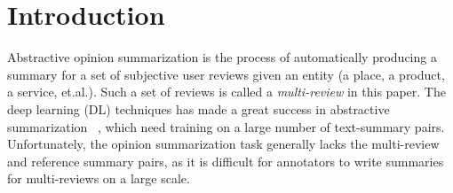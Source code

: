 \section{Introduction}
\label{sec:intro}


Abstractive opinion summarization is the process of 
automatically producing a summary for a set of 
subjective user reviews given an entity 
(a place, a product, a service, et.al.). 
Such a set of reviews is called a {\em multi-review} in this paper. 
The deep learning (DL) techniques has made a great success 
in abstractive summarization
~\cite{NallapatiZSGX16,SeeLM17,LiuLZ18,CelikyilmazBHC18,BART20}, which need training on a large number of text-summary pairs.
Unfortunately, the opinion summarization task 
generally lacks the multi-review and reference summary pairs,
as it is difficult for annotators to write summaries for 
multi-reviews on a large scale.

